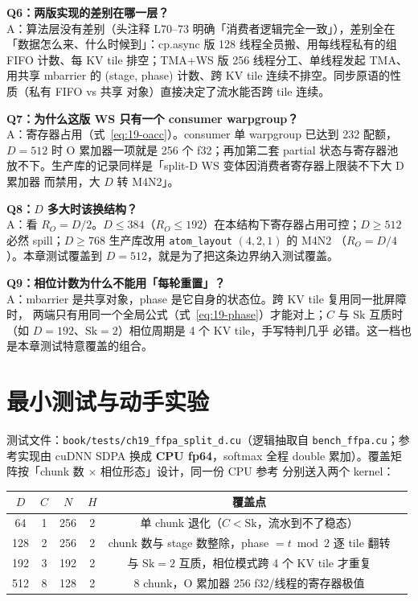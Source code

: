 \textbf{Q6：两版实现的差别在哪一层？}\\
A：算法层没有差别（头注释 L70--73 明确「消费者逻辑完全一致」），差别全在
「数据怎么来、什么时候到」：cp.async 版 128 线程全员搬、用每线程私有的组 FIFO
计数、每 KV tile 排空；TMA+WS 版 256 线程分工、单线程发起 TMA、用共享 mbarrier 的
(stage, phase) 计数、跨 KV tile 连续不排空。同步原语的性质（私有 FIFO vs 共享
对象）直接决定了流水能否跨 tile 连续。

\textbf{Q7：为什么这版 WS 只有一个 consumer warpgroup？}\\
A：寄存器占用（式~\ref{eq:19-oacc}）。consumer 单 warpgroup 已达到 232 配额，
$D{=}512$ 时 O 累加器一项就是 256 个 f32；再加第二套 partial 状态与寄存器池
放不下。生产库的记录同样是「split-D WS 变体因消费者寄存器上限装不下大 D 累加器
而禁用，大 $D$ 转 M4N2」。

\textbf{Q8：$D$ 多大时该换结构？}\\
A：看 $R_O = D/2$。$D \le 384$（$R_O \le 192$）在本结构下寄存器占用可控；$D \ge 512$
必然 spill；$D \ge 768$ 生产库改用 \texttt{atom\_layout} $(4,2,1)$ 的 M4N2
（$R_O = D/4$）。本章测试覆盖到 $D{=}512$，就是为了把这条边界纳入测试覆盖。

\textbf{Q9：相位计数为什么不能用「每轮重置」？}\\
A：mbarrier 是共享对象，phase 是它自身的状态位。跨 KV tile 复用同一批屏障时，
两端只有用同一个全局公式（式~\ref{eq:19-phase}）才能对上；$C$ 与 $\mathrm{Sk}$
互质时（如 $D{=}192$、$\mathrm{Sk}{=}2$）相位周期是 4 个 KV tile，手写特判几乎
必错。这一档也是本章测试特意覆盖的组合。

\section{最小测试与动手实验}

测试文件：\texttt{book/\allowbreak{}tests/\allowbreak{}ch19\_\allowbreak{}ffpa\_\allowbreak{}split\_\allowbreak{}d.cu}（逻辑抽取自
\texttt{bench\_\allowbreak{}ffpa.\allowbreak{}cu}；参考实现由 cuDNN SDPA 换成 \textbf{CPU fp64}，softmax
全程 double 累加）。覆盖矩阵按「chunk 数 $\times$ 相位形态」设计，同一份 CPU 参考
分别送入两个 kernel：

\begin{center}
\begin{tabular}{cccccl}
\toprule
$D$ & $C$ & $N$ & $H$ & 覆盖点 & \\
\midrule
64 & 1 & 256 & 2 & 单 chunk 退化（$C < \mathrm{Sk}$，流水到不了稳态） & \\
128 & 2 & 256 & 2 & chunk 数与 stage 数整除，phase $= t \bmod 2$ 逐 tile 翻转 & \\
192 & 3 & 192 & 2 & 与 $\mathrm{Sk}{=}2$ 互质，相位模式跨 4 个 KV tile 才重复 & \\
512 & 8 & 128 & 2 & 8 chunk，O 累加器 256 f32/线程的寄存器极值 & \\
\bottomrule
\end{tabular}
\end{center}


